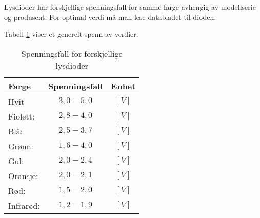 Lysdioder har forskjellige spenningsfall for samme farge avhengig av modellserie og produsent. For optimal verdi må man lese databladet til dioden. 

Tabell \ref{tab:LEDspenningsfall} viser et generelt spenn av verdier.

\begin{table}[!ht]
	\caption{Spenningsfall for forskjellige lysdioder}
	\label{tab:LEDspenningsfall}
	\begin{center}
		\begin{tabular}{|l|c|c|} 
			\hline
			Farge & Spenningsfall & Enhet \\ [0.5ex] 
			\hline\hline
			Hvit & $3,0 - 5,0$ &$ [V]$ \\
			\hline
			Fiolett: &  $2,8 - 4,0$ &$ [V]$\\
			\hline
			Blå: &  $2,5 - 3,7$ &$ [V]$\\
			\hline
			Grønn: &  $1,6 - 4,0$ &$ [V]$\\
			\hline
			Gul: &  $2,0 - 2,4$ &$ [V]$\\
			\hline
			Oransje: &  $2,0 - 2,1$ &$ [V]$\\
			\hline
			Rød: &  $1,5 - 2,0$ &$ [V]$\\
			\hline
			Infrarød: &  $1,2 - 1,9$ &$ [V]$\\
			\hline
		\end{tabular}
	\end{center}
\end{table}

